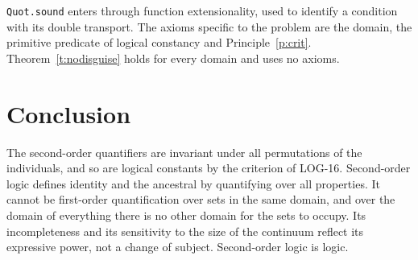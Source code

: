 \documentclass{situationist-preprint}
\begin{document}
\texttt{Quot.sound} enters through function extensionality, used to identify a condition with its double transport. The axioms specific to the problem are the domain, the primitive predicate of logical constancy and Principle~\ref{p:crit}. Theorem~\ref{t:nodisguise} holds for every domain and uses no axioms.

\section{Conclusion}

The second-order quantifiers are invariant under all permutations of the individuals, and so are logical constants by the criterion of LOG-16. Second-order logic defines identity and the ancestral by quantifying over all properties. It cannot be first-order quantification over sets in the same domain, and over the domain of everything there is no other domain for the sets to occupy. Its incompleteness and its sensitivity to the size of the continuum reflect its expressive power, not a change of subject. Second-order logic is logic.
\end{document}
